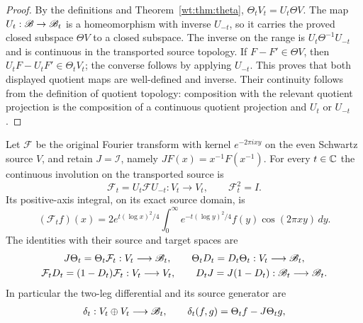 \begin{proof}
By the definitions and Theorem~\ref{wt:thm:theta},
$\Theta_tV_t=U_t\Theta V$.  The map $U_t:\mathscr B\to\mathscr B_t$ is a
homeomorphism with inverse $U_{-t}$, so it carries the proved
closed subspace $\Theta V$ to a closed subspace.  The inverse on
the range is $U_t\Theta^{-1}U_{-t}$ and is continuous in the
transported source topology.  If $F-F'\in\Theta V$, then
$U_tF-U_tF'\in\Theta_tV_t$; the converse follows by applying
$U_{-t}$.  This proves that both displayed quotient maps are
well-defined and inverse.  Their continuity follows from the
definition of quotient topology: composition with the relevant
quotient projection is the composition of a continuous quotient
projection and $U_t$ or $U_{-t}$.
\end{proof}

\begin{proposition}
\label{wt:prop:Fourier-chain}
Let $\mathcal F$ be the original Fourier transform with kernel
$e^{-2\pi ixy}$ on the even Schwartz source $V$, and retain
$J=\mathcal I$, namely $JF(x)=x^{-1}F(x^{-1})$.  For every
$t\in\mathbb C$ the continuous involution on the transported source is
\begin{equation}\label{wt:eq:Fourier-transport}
 \mathcal F_t=U_t\mathcal F U_{-t}:V_t\longrightarrow V_t,
 \qquad \mathcal F_t^2=I.
\end{equation}
Its positive-axis integral, on its exact source domain, is
\begin{equation}\label{wt:eq:Fourier-kernel}
 (\mathcal F_tf)(x)=2e^{t(\log x)^2/4}
 \int_0^\infty e^{-t(\log y)^2/4}f(y)\cos(2\pi xy)\,dy.
\end{equation}
The identities with their source and target spaces are
\begin{equation}\label{wt:eq:Fourier-identities}
 \begin{gathered}
 J\Theta_t=\Theta_t\mathcal F_t:V_t\longrightarrow\mathscr B_t,
 \qquad \Theta_tD_t=D_t\Theta_t:V_t\longrightarrow\mathscr B_t,\\
 \mathcal F_tD_t=(1-D_t)\mathcal F_t:V_t\longrightarrow V_t,
 \qquad D_tJ=J(1-D_t):\mathscr B_t\longrightarrow\mathscr B_t.
 \end{gathered}
\end{equation}
In particular the two-leg differential and its source generator are
\begin{equation}\label{wt:eq:two-leg}
 \begin{gathered}
 \delta_t:V_t\oplus V_t\longrightarrow\B_t,
 \qquad\delta_t(f,g)=\Theta_tf-J\Theta_tg,\\

\end{gathered}
\end{equation}
\end{proposition}
